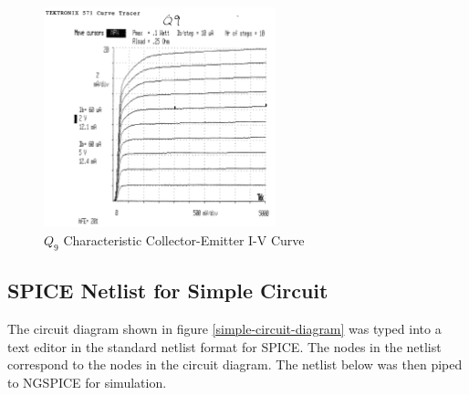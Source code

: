 \documentclass[titlepage, letterpaper, 10.5pt]{article}
\begin{document}
\begin{figure}[ht]
	\centering
	\includegraphics[width=0.6\textwidth]{results/q9-characteristics}
	\caption{$Q_{9}$ Characteristic Collector-Emitter I-V Curve}
\end{figure}

\clearpage
\subsection{SPICE Netlist for Simple Circuit}
\label{simple-circuit-netlist}

The circuit diagram shown in figure \ref{simple-circuit-diagram} was typed into a text editor
in the standard netlist format for SPICE. The nodes in the netlist correspond to the
nodes in the circuit diagram. The netlist below was then piped to NGSPICE for simulation.


\end{document}
